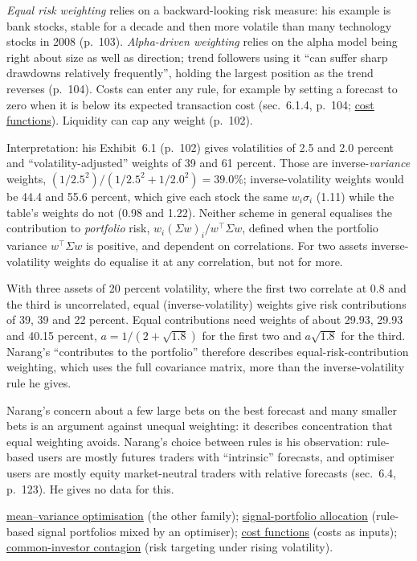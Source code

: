 \begin{qfmethod}
\emph{Equal risk weighting} relies on a backward-looking risk measure: his example is bank stocks, stable for a decade and then more volatile than many technology stocks in 2008 (p.~103). \emph{Alpha-driven weighting} relies on the alpha model being right about size as well as direction; trend followers using it ``can suffer sharp drawdowns relatively frequently'', holding the largest position as the trend reverses (p.~104). Costs can enter any rule, for example by setting a forecast to zero when it is below its expected transaction cost (sec.~6.1.4, p.~104; \hyperref[mod:portfolio-transaction-cost-function]{cost functions}). Liquidity can cap any weight (p.~102).

 Interpretation: his Exhibit~6.1 (p.~102) gives volatilities of 2.5 and 2.0 percent and ``volatility-adjusted'' weights of 39 and 61 percent. Those are inverse-\emph{variance} weights, $(1/2.5^2)/(1/2.5^2+1/2.0^2)=39.0\%$; inverse-volatility weights would be 44.4 and 55.6 percent, which give each stock the same $w_i\sigma_i$ (1.11) while the table's weights do not (0.98 and 1.22). Neither scheme in general equalises the contribution to \emph{portfolio} risk, $w_i(\Sigma w)_i/w^\top\Sigma w$, defined when the portfolio variance $w^\top\Sigma w$ is positive, and dependent on correlations. For two assets inverse-volatility weights do equalise it at any correlation, but not for more.

With three assets of 20 percent volatility, where the first two correlate at 0.8 and the third is uncorrelated, equal (inverse-volatility) weights give risk contributions of 39, 39 and 22 percent. Equal contributions need weights of about 29.93, 29.93 and 40.15 percent, $a=1/(2+\sqrt{1.8})$ for the first two and $a\sqrt{1.8}$ for the third. Narang's ``contributes to the portfolio'' therefore describes equal-risk-contribution weighting, which uses the full covariance matrix, more than the inverse-volatility rule he gives.

 Narang's concern about a few large bets on the best forecast and many smaller bets is an argument against unequal weighting: it describes concentration that equal weighting avoids. Narang's choice between rules is his observation: rule-based users are mostly futures traders with ``intrinsic'' forecasts, and optimiser users are mostly equity market-neutral traders with relative forecasts (sec.~6.4, p.~123). He gives no data for this.

 \hyperref[mod:mean-variance-portfolio-optimisation]{mean--variance optimisation} (the other family); \hyperref[meth:signal-portfolio-allocation]{signal-portfolio allocation} (rule-based signal portfolios mixed by an optimiser); \hyperref[mod:portfolio-transaction-cost-function]{cost functions} (costs as inputs); \hyperref[def:common-investor-contagion]{common-investor contagion} (risk targeting under rising volatility).


\end{qfmethod}
